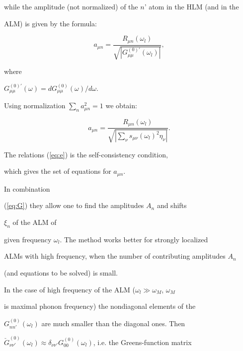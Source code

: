while the amplitude (not normalized) of the $n$' atom in the HLM (and in the 

ALM) is given by the formula: 

\begin{equation}

a_{\mu n} = \frac{R_{\mu n}(\omega_l)}{\sqrt{|G^{(0)'}_{\mu \mu} (\omega_l)|}},

\label{eq:d}

\end{equation} 

where  

$G^{(0)'}_{\mu \mu}(\omega) = d G^{(0)}_{\mu \mu}(\omega)/ d \omega$. 

Using normalization $\sum_n a_{\mu n}^2 = 1$ we obtain: 

\begin{equation} 

a_{\mu n} = 

\frac{R_{\mu n}(\omega_l)}{\sqrt{|\sum_{\nu} s_{\mu \nu}(\omega_l)^2 

\eta_{\nu}|}}. 

\label{eq:e}

\end{equation} 

The relations (\ref{eq:e}) is the self-consistency condition, 

which gives the set of equations for $a_{\mu n}$. 

In combination 

(\ref{eq:G}) they allow one to find the amplitudes $A_{n}$ and shifts

$\xi_n$ of the ALM of 

given frequency $\omega_l$. The method works better for strongly localized 

ALMs with high frequency, when the number of contributing amplitudes $A_n$

(and equations to be solved) is small. 



In the case of high frequency of the ALM ($\omega_l \gg \omega_M$, $\omega_M$ 

is maximal phonon frequency) the nondiagonal elements of the  

$G^{(0)}_{nn'}(\omega_l)$ are much smaller than the diagonal ones. Then 

$\check{G}^{(0)}_{\nu \nu'}(\omega_l) \approx \delta_{\nu \nu'}  

G^{(0)}_{00}(\omega_l)$, i.e. the Greens-function matrix 

